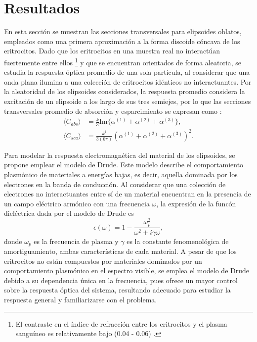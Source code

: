 	\hypertarget{resultados}{\section{Resultados}}
En esta sección se muestran las secciones transversales para elipsoides oblatos, empleados como una primera aproximación a la forma discoide cóncava de los eritrocitos. Dado que los eritrocitos en una muestra real no interactúan fuertemente entre ellos \footnote{El contraste en el índice de refracción entre los eritrocitos y el plasma sanguíneo es relativamente bajo (0.04 - 0.06) \cite{Blood}.} y que se encuentran orientados de forma aleatoria, se estudia la respuesta óptica promedio de una sola partícula, al considerar que una onda plana  ilumina a una colección de eritrocitos idénticos no interactuantes.  Por la aleatoridad de los elipsoides considerados, la respuesta promedio considera la excitación de un elipsoide a los largo de sus tres semiejes, por lo que las secciones transversales promedio de absorción y esparcimiento se expresan como \cite{Bohren}:
\begin{align*}
	\langle C_{abs}\rangle &= \frac{k}{3} \text{Im}\{\alpha^{(1)}+\alpha^{(2)}+\alpha^{(3)}\},\\
	\langle C_{sca}\rangle &= \frac{k^4}{3(6\pi)} \left(\alpha^{(1)}+\alpha^{(2)}+\alpha^{(3)}\right)^2.
\end{align*}

Para modelar la respuesta electromagnética del material de los elipsoides, se propone emplear el modelo de Drude. Este modelo describe el comportamiento plasmónico de materiales a energías bajas, es decir, aquella dominada por los electrones en la banda de conducción. Al considerar que una colección de electrones no interactuantes entre sí de un material encuentran en la presencia de un campo eléctrico armónico con una frecuencia $\omega$, la expresión de la funcón dieléctrica dada por  el modelo de Drude es \cite{Plasmonics}
\begin{equation} \epsilon(\omega) = 1 - \frac{\omega_p^2}{\omega^2 + i\gamma\omega}, \end{equation}
donde $\omega_p$ es la frecuencia de plasma y $\gamma$ es la constante fenomenológica de amortiguamiento, ambas características de cada material. A pesar de  que los eritrocitos no están compuestos por materiales dominados por un comportamiento plasmónico en el espectro visible, se emplea el modelo de Drude debido a su dependencia única en la frecuencia, pues ofrece un mayor control sobre la respuesta óptica del sistema, resultando adecuado para estudiar la respuesta general y familiarizarse con el problema.\\

